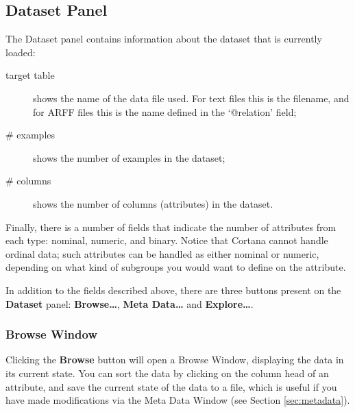 \documentclass{article}
\begin{document}
\subsection{Dataset Panel}
\label{sec:dataset}


The Dataset panel contains information about the dataset that is currently
loaded:
\begin{description}
\item[target table] shows the name of the data file used. For text
files this is the filename, and for ARFF files this is the name defined in the
`@relation' field;
\item[\# examples] shows the number of examples in the dataset;
\item[\# columns] shows the number of columns (attributes) in the dataset.
\end{description}
Finally, there is a number of fields that indicate the number of attributes
from each \gls{type}: \gls{nominal}, \gls{numeric}, and \gls{binary}. Notice
that Cortana cannot handle \gls{ordinal} data; such attributes can be
handled as either \gls{nominal} or \gls{numeric}, depending on what kind of
subgroups you would want to define on the attribute.

In addition to the fields described above, there are three buttons present
on the {\bf Dataset} panel: {\bf Browse\ldots}, {\bf Meta Data\ldots} and
{\bf Explore\ldots}.

\subsubsection{Browse Window}
\label{sec:browsewindow}

Clicking the \textbf{Browse} button will open a Browse Window, displaying
the data in its current state.  You can sort the data by clicking on the
column head of an attribute, and save the current state of the data to a
file, which is useful if you have made modifications via the Meta Data
Window (see Section \ref{sec:metadata}).

\end{document}

